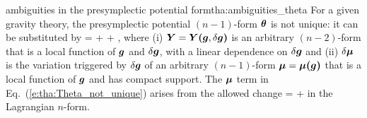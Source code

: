 \begin{tprop}{ambiguities in the presymplectic potential form}{tha:ambiguities_theta}
For a given gravity theory, the presymplectic potential $(n-1)$-form $\bm{\theta}$
is not unique: it can be substituted by
\be \label{e:tha:Theta_not_unique}
   = \w{\theta} + \dd {} + \delta\w{\mu},
\ee
where (i) $\bm{Y}=\bm{Y}\textbf{(}\bm{g},\delta\bm{g}\textbf{)}$ is an
arbitrary $(n-2)$-form that is a local function of $\bm{g}$ and $\delta\bm{g}$,
with a linear dependence on $\delta\bm{g}$ and (ii)
$\delta\bm{\mu}$ is the variation triggered by $\delta\bm{g}$
of an arbitrary $(n-1)$-form $\bm{\mu} = \bm{\mu}\textbf{(}\bm{g}\textbf{)}$
that is a local function of $\bm{g}$ and has compact support.
The $\bm{\mu}$ term in Eq.~(\ref{e:tha:Theta_not_unique}) arises from the allowed
change
\be \label{e:tha:L_not_unique}
     =  + \dd\w{\mu}
\ee
in the Lagrangian $n$-form.
\end{tprop}



